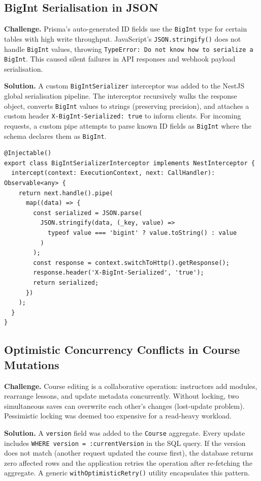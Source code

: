 \subsection{BigInt Serialisation in JSON}

\textbf{Challenge.} Prisma's auto-generated ID fields use the \texttt{BigInt} type for certain tables with high write throughput. JavaScript's \texttt{JSON.stringify()} does not handle \texttt{BigInt} values, throwing \texttt{TypeError: Do not know how to serialize a BigInt}. This caused silent failures in API responses and webhook payload serialisation.

\textbf{Solution.} A custom \texttt{BigIntSerializer} interceptor was added to the NestJS global serialisation pipeline. The interceptor recursively walks the response object, converts \texttt{BigInt} values to strings (preserving precision), and attaches a custom header \texttt{X-BigInt-Serialized: true} to inform clients. For incoming requests, a custom pipe attempts to parse known ID fields as \texttt{BigInt} where the schema declares them as \texttt{BigInt}.

\begin{lstlisting}[caption=BigInt serialisation interceptor,label=lst:bigint-serializer]
@Injectable()
export class BigIntSerializerInterceptor implements NestInterceptor {
  intercept(context: ExecutionContext, next: CallHandler): Observable<any> {
    return next.handle().pipe(
      map((data) => {
        const serialized = JSON.parse(
          JSON.stringify(data, (_key, value) =>
            typeof value === 'bigint' ? value.toString() : value
          )
        );
        const response = context.switchToHttp().getResponse();
        response.header('X-BigInt-Serialized', 'true');
        return serialized;
      })
    );
  }
}
\end{lstlisting}

\subsection{Optimistic Concurrency Conflicts in Course Mutations}

\textbf{Challenge.} Course editing is a collaborative operation: instructors add modules, rearrange lessons, and update metadata concurrently. Without locking, two simultaneous saves can overwrite each other's changes (lost-update problem). Pessimistic locking was deemed too expensive for a read-heavy workload.

\textbf{Solution.} A \texttt{version} field was added to the \texttt{Course} aggregate. Every update includes \texttt{WHERE version = :currentVersion} in the SQL query. If the version does not match (another request updated the course first), the database returns zero affected rows and the application retries the operation after re-fetching the aggregate. A generic \texttt{withOptimisticRetry()} utility encapsulates this pattern.


